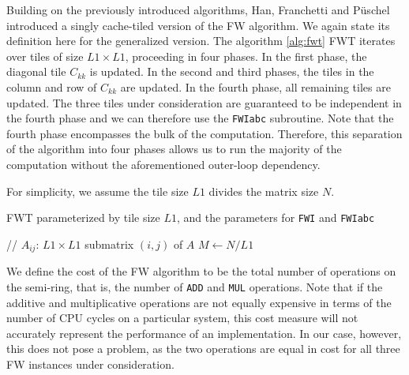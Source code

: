 Building on the previously introduced algorithms, Han, Franchetti and Püschel
\cite{han06generation} introduced a singly cache-tiled version of the FW algorithm. We
again state its definition here for the generalized version. The algorithm \ref{alg:fwt} FWT
iterates over tiles of size $L1 \times L1$,
proceeding in four phases. In the first phase, the diagonal tile $C_{kk}$ is updated.
In the second and third phases, the tiles in the column and row of $C_{kk}$ are updated.
In the fourth phase, all remaining tiles are updated. The three tiles under
consideration are guaranteed to be independent in the fourth phase and we can therefore
use the \texttt{FWIabc} subroutine. Note that the fourth phase encompasses the bulk of
the computation. Therefore, this separation of the algorithm into four phases allows us to run
the majority of the computation without the aforementioned outer-loop dependency.

For simplicity, we assume the tile size $L1$ divides the matrix size $N$.

\begin{algorithm}
  \caption{FWT parameterized by tile size $L1$, and the parameters for \texttt{FWI} and \texttt{FWIabc}}\label{alg:fwt}
  \begin{algorithmic}[1]
      \State // $A_{ij}$: $L1 \times L1$ submatrix $(i,j)$ of $A$
      \State $M\gets N/L1$
        \State {}
          \State {}
        \EndFor
          \State {}
        \EndFor
          \State {}
        \EndFor
        \EndFor
      \EndFor
    \EndFunction
  \end{algorithmic}
\end{algorithm}

We define the cost of the FW algorithm to be the total number of operations on the
semi-ring, that is, the number of \texttt{ADD} and \texttt{MUL} operations.
Note that if the additive and
multiplicative operations are not equally expensive in terms of the number of CPU
cycles on a particular system, this cost measure will not accurately represent the
performance of an implementation. In our case, however, this does not pose a problem,
as the two operations are equal in cost for all three FW instances under consideration.

